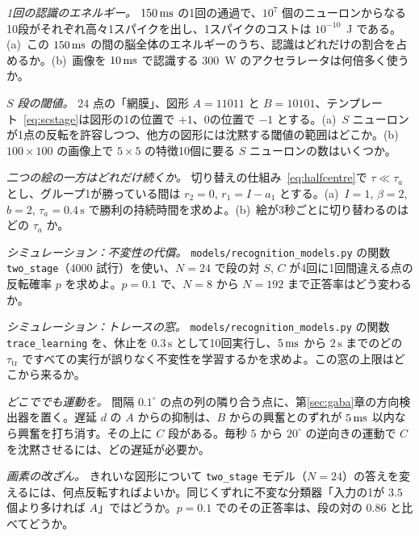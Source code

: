 \begin{exercise}[\lvlA]
\label{ex:12:2}
\emph{1回の認識のエネルギー。} $150\,\text{ms}$ の1回の通過で、$10^7$ 個のニューロンからなる10段がそれぞれ高々1スパイクを出し、1スパイクのコストは $10^{-10}$~J である。(a)~この $150\,\text{ms}$ の間の脳全体のエネルギーのうち、認識はどれだけの割合を占めるか。(b)~画像を $10\,\text{ms}$ で認識する $300$~W のアクセラレータは何倍多く使うか。
\end{exercise}

\begin{exercise}[\lvlB]
\label{ex:12:3}
\emph{$S$ 段の閾値。} $24$ 点の「網膜」、図形 $A=11011$ と $B=10101$、テンプレート~\eqref{eq:scstage}は図形の1の位置で $+1$、0の位置で $-1$ とする。(a)~$S$ ニューロンが1点の反転を許容しつつ、他方の図形には沈黙する閾値の範囲はどこか。(b)~$100\times100$ の画像上で $5\times5$ の特徴10個に要る $S$ ニューロンの数はいくつか。
\end{exercise}

\begin{exercise}[\lvlB]
\label{ex:12:4}
\emph{二つの絵の一方はどれだけ続くか。} 切り替えの仕組み~\eqref{eq:halfcentre}で $\tau\ll\tau_a$ とし、グループ1が勝っている間は $r_2=0$, $r_1=I-a_1$ とする。(a)~$I=1$, $\beta=2$, $b=2$, $\tau_a=0.4\,\text{s}$ で勝利の持続時間を求めよ。(b)~絵が3秒ごとに切り替わるのはどの $\tau_a$ か。
\end{exercise}

\begin{exercise}[\lvlB]
\label{ex:12:5}
\emph{シミュレーション：不変性の代償。} \texttt{models/\allowbreak recognition\_models.py} の関数 \texttt{two\_stage}（$4000$ 試行）を使い、$N=24$ で段の対 $S$, $C$ が4回に1回間違える点の反転確率 $p$ を求めよ。$p=0.1$ で、$N=8$ から $N=192$ まで正答率はどう変わるか。
\end{exercise}

\begin{exercise}[\lvlB]
\label{ex:12:6}
\emph{シミュレーション：トレースの窓。} \texttt{models/\allowbreak recognition\_models.py} の関数 \texttt{trace\_learning} を、休止を $0.3\,\text{s}$ として10回実行し、$5\,\text{ms}$ から $2\,\text{s}$ までのどの $\tau_{\text{tr}}$ ですべての実行が誤りなく不変性を学習するかを求めよ。この窓の上限はどこから来るか。
\end{exercise}

\begin{exercise}[\lvlB]
\label{ex:12:7}
\emph{どこででも運動を。} 間隔 $0.1^\circ$ の点の列の隣り合う点に、第\ref{sec:gaba}章の方向検出器を置く。遅延 $d$ の $A$ からの抑制は、$B$ からの興奮とのずれが $5\,\text{ms}$ 以内なら興奮を打ち消す。その上に $C$ 段がある。毎秒 $5$ から $20^\circ$ の逆向きの運動で $C$ を沈黙させるには、どの遅延が必要か。
\end{exercise}

\begin{exercise}[\lvlC]
\label{ex:12:8}
\emph{画素の改ざん。} きれいな図形について \texttt{two\_stage} モデル（$N=24$）の答えを変えるには、何点反転すればよいか。同じくずれに不変な分類器「入力の1が $3.5$ 個より多ければ $A$」ではどうか。$p=0.1$ でのその正答率は、段の対の $0.86$ と比べてどうか。
\end{exercise}
